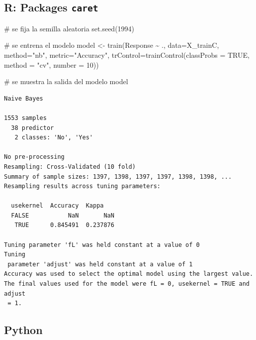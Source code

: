\documentclass[
  letterpaper,
  DIV=11,
  numbers=noendperiod]{scrartcl}
\newenvironment{Shaded}{\begin{snugshade}}{\end{snugshade}}
\newcommand{\AttributeTok}[1]{\textcolor[rgb]{0.40,0.45,0.13}{#1}}
\newcommand{\CommentTok}[1]{\textcolor[rgb]{0.37,0.37,0.37}{#1}}
\newcommand{\ConstantTok}[1]{\textcolor[rgb]{0.56,0.35,0.01}{#1}}
\newcommand{\DecValTok}[1]{\textcolor[rgb]{0.68,0.00,0.00}{#1}}
\newcommand{\FunctionTok}[1]{\textcolor[rgb]{0.28,0.35,0.67}{#1}}
\newcommand{\NormalTok}[1]{\textcolor[rgb]{0.00,0.23,0.31}{#1}}
\newcommand{\OtherTok}[1]{\textcolor[rgb]{0.00,0.23,0.31}{#1}}
\newcommand{\SpecialCharTok}[1]{\textcolor[rgb]{0.37,0.37,0.37}{#1}}
\newcommand{\StringTok}[1]{\textcolor[rgb]{0.13,0.47,0.30}{#1}}
\begin{document}
\subsection{\texorpdfstring{R: Packages
\texttt{caret}}{R: Packages caret}}

\begin{Shaded}
\begin{Highlighting}[]
\CommentTok{\# se fija la semilla aleatoria}
\FunctionTok{set.seed}\NormalTok{(}\DecValTok{1994}\NormalTok{)}

\CommentTok{\# se entrena el modelo}
\NormalTok{model }\OtherTok{\textless{}{-}} \FunctionTok{train}\NormalTok{(Response }\SpecialCharTok{\textasciitilde{}}\NormalTok{ .,}
            \AttributeTok{data=}\NormalTok{X\_trainC,}
            \AttributeTok{method=}\StringTok{"nb"}\NormalTok{,}
            \AttributeTok{metric=}\StringTok{"Accuracy"}\NormalTok{,}
            \AttributeTok{trControl=}\FunctionTok{trainControl}\NormalTok{(}\AttributeTok{classProbs =} \ConstantTok{TRUE}\NormalTok{,}
                                   \AttributeTok{method =} \StringTok{"cv"}\NormalTok{,}
                                   \AttributeTok{number =} \DecValTok{10}\NormalTok{))}

\CommentTok{\# se muestra la salida del modelo}
\NormalTok{model}
\end{Highlighting}
\end{Shaded}

\begin{verbatim}
Naive Bayes 

1553 samples
  38 predictor
   2 classes: 'No', 'Yes' 

No pre-processing
Resampling: Cross-Validated (10 fold) 
Summary of sample sizes: 1397, 1398, 1397, 1397, 1398, 1398, ... 
Resampling results across tuning parameters:

  usekernel  Accuracy  Kappa   
  FALSE           NaN       NaN
   TRUE      0.845491  0.237876

Tuning parameter 'fL' was held constant at a value of 0
Tuning
 parameter 'adjust' was held constant at a value of 1
Accuracy was used to select the optimal model using the largest value.
The final values used for the model were fL = 0, usekernel = TRUE and adjust
 = 1.
\end{verbatim}

\subsection{Python}
\end{document}
